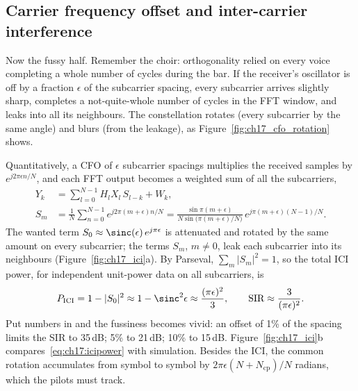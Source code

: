 \subsection{Carrier frequency offset and inter-carrier interference}

Now the fussy half. Remember the choir: orthogonality relied on every voice completing a whole
number of cycles during the bar. If the receiver's oscillator is off by a fraction $\epsilon$ of
the subcarrier spacing, every subcarrier arrives slightly sharp, completes a not-quite-whole number
of cycles in the FFT window, and leaks into all its neighbours. The constellation rotates (every
subcarrier by the same angle) and blurs (from the leakage), as Figure~\ref{fig:ch17_cfo_rotation}
shows.


Quantitatively, a CFO of $\epsilon$ subcarrier spacings multiplies the received samples by
$e^{j2\pi\epsilon n/N}$, and each FFT output becomes a weighted sum of all the subcarriers,
\begin{equation}
\begin{split}
Y_k&=\sum_{l=0}^{N-1}H_lX_l\,S_{l-k}+W_k,\\
S_m&=\frac1N\sum_{n=0}^{N-1}e^{j2\pi(m+\epsilon)n/N}
=\frac{\sin\pi(m+\epsilon)}{N\sin\big(\pi(m+\epsilon)/N\big)}\,e^{j\pi(m+\epsilon)(N-1)/N}.
\end{split}
\label{eq:ch17:ici}
\end{equation}
The wanted term $S_0\approx\sinc(\epsilon)\,e^{j\pi\epsilon}$ is attenuated and rotated by the same amount
on every subcarrier; the terms $S_m$, $m\ne0$, leak each subcarrier into its neighbours
(Figure~\ref{fig:ch17_ici}a). By Parseval, $\sum_m|S_m|^2=1$, so the total ICI power, for independent unit-power
data on all subcarriers, is
\begin{equation}
P_{\text{ICI}}=1-|S_0|^2\approx1-\sinc^2\epsilon\approx\frac{(\pi\epsilon)^2}{3},\qquad
\text{SIR}\approx\frac{3}{(\pi\epsilon)^2}.
\label{eq:ch17:icipower}
\end{equation}
Put numbers in and the fussiness becomes vivid: an offset of 1\% of the spacing limits the SIR to
35\,dB; 5\% to 21\,dB; 10\% to 15\,dB. Figure~\ref{fig:ch17_ici}b compares~\eqref{eq:ch17:icipower}
with simulation. Besides the ICI, the common rotation accumulates from symbol to symbol by
$2\pi\epsilon(N+N_{\text{cp}})/N$ radians, which the pilots must track.

